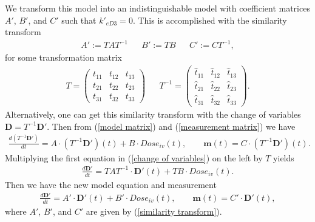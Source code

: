 We transform this model into an indistinguishable model with coefficient matrices $A'$, $B'$, and $C'$ such that $k'_{eD3} = 0$. This is accomplished with the similarity transform
\begin{align}
A' := TAT^{-1} && B' := TB && C' := CT^{-1}, \label{similarity transform}
\end{align}
for some transformation matrix
\begin{align}
T = \begin{pmatrix}
t_{11} & t_{12} & t_{13} \\
t_{21} & t_{22} & t_{23} \\
t_{31} & t_{32} & t_{33} 
\end{pmatrix} &&
T^{-1} = \begin{pmatrix}
\hat{t}_{11} & \hat{t}_{12} & \hat{t}_{13} \\
\hat{t}_{21} & \hat{t}_{22} & \hat{t}_{23} \\
\hat{t}_{31} & \hat{t}_{32} & \hat{t}_{33} 
\end{pmatrix}.
\end{align}
Alternatively, one can get this similarity transform with the change of variables $\mathbf{D} = T^{-1}\mathbf{D'}$. Then from (\ref{model matrix}) and (\ref{measurement matrix}) we have
\begin{align}
\frac{d(T^{-1}\mathbf{D'})}{dt} = A \cdot (T^{-1}\mathbf{D'})(t) + B \cdot Dose_{iv}(t), \qquad \mathbf{m}(t) = C \cdot (T^{-1}\mathbf{D'})(t). \label{change of variables}
\end{align}
Multiplying the first equation in (\ref{change of variables}) on the left by $T$ yields
\begin{align}
\frac{d\mathbf{D'}}{dt} = TAT^{-1} \cdot \mathbf{D'}(t) + TB \cdot Dose_{iv}(t).
\end{align}
Then we have the new model equation and measurement
\begin{align}
\frac{d\mathbf{D'}}{dt} = A' \cdot \mathbf{D'}(t) + B' \cdot Dose_{iv}(t), \qquad \mathbf{m}(t) = C' \cdot \mathbf{D'}(t),
\end{align}
where $A'$, $B'$, and $C'$ are given by (\ref{similarity transform}).

